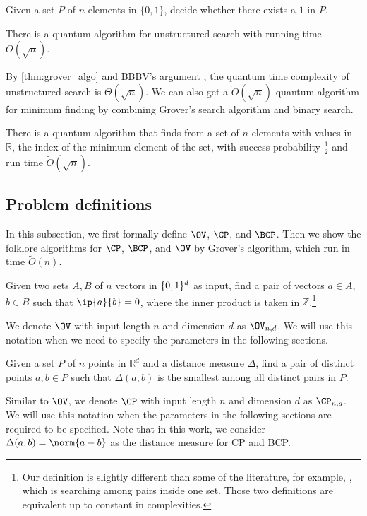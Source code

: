 \begin{definition}
Given a set $P$ of $n$ elements in $\{0,1\}$, decide whether there exists a $1$ in $P$. 
\end{definition}

\begin{theorem}\label{thm:grover_algo}
There is a quantum algorithm for unstructured search with running time $O(\sqrt{n})$.
\end{theorem}

By \cref{thm:grover_algo} and BBBV's argument \cite{r9}, the quantum time complexity of unstructured search is $\Theta(\sqrt{n})$. We can also get a $\tilde{O}(\sqrt{n})$ quantum algorithm for minimum finding by combining Grover's search algorithm and binary search.
\begin{theorem}\label{thm:mim}
There is a quantum algorithm that finds from a set of $n$ elements with values in $\mathbb{R}$, the index of the minimum element of the set, with success probability $\frac{1}{2}$ and run time $\tilde{O}(\sqrt{n})$.
\end{theorem}

\subsection{Problem definitions}
In this subsection, we first formally define  $\OV$, $\CP$, and $\BCP$. Then we show the folklore algorithms for $\CP$, $\BCP$, and $\OV$ by Grover's algorithm, which run in time $\tilde{O}(n)$. 
\begin{definition}\label{def:OV}
Given two sets $A,B$ of $n$ vectors in $\mathbb \{0,1\}^d$ as input, find a pair of vectors $a\in A$, $b\in B$ such that
$\ip{a}{b}=0$, where the inner product is taken in $\mathbb{Z}$.\footnote{Our definition is slightly different than some of the literature, for example, \cite{r18}, which is searching among pairs inside one set. Those two definitions are equivalent up to constant in complexities.}
\end{definition}

We denote $\OV$ with input length $n$ and dimension $d$ as $\OV_{n,d}$. We will use this notation when we need to specify the parameters in the following sections.  

\begin{definition}
Given a set $P$ of $n$ points in $\mathbb R^d$ and a distance measure $\Delta$, find a pair of distinct points $a,b\in P$ such that $\Delta(a,b)$ is the smallest among all distinct pairs in $P$.
\end{definition}
Similar to $\OV$, we denote $\CP$ with input length $n$ and dimension $d$ as $\CP_{n,d}$. We will use this notation when the parameters in the following sections are required to be specified. Note that in this work, we consider $\Delta(a, b) = \norm{a-b}$ as the distance measure for \textsf{CP} and \textsf{BCP}.

